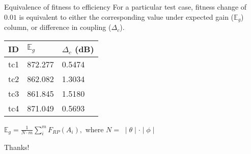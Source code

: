 \documentclass{beamer}
\begin{document}
\begin{frame}{Equivalence of fitness to efficiency}
\small For a particular test case, fitness change of $0.01$ is equivalent to either the corresponding value under expected gain ($\mathbb E_g$) column, or difference in coupling ($\Delta_c$).
\begin{table}
\centering
  \begin{threeparttable}
      \begin{tabular}{|C{1cm}|C{2.5cm}|C{2.5cm}|} \hline
          ID& $\mathbb E_g$ & $\Delta_{c}$ (dB) \\ \hline
tc1 & 872.277 & 0.5474 \\ \hline
tc2 & 862.082 & 1.3034 \\ \hline
tc3 & 861.845 & 1.5180 \\ \hline
tc4 & 871.049 & 0.5693 \\
\hline\end{tabular}
\end{threeparttable}
\end{table}
\tiny
    $\mathbb E_g = \frac{1}{N \cdot m} \sum_{i}^m F_{RP}(A_i),$
where $N = \;\mid \theta \mid \cdot \mid \phi \mid$
\end{frame}
\begin{frame}
    Thanks!
\end{frame}
\end{document}
